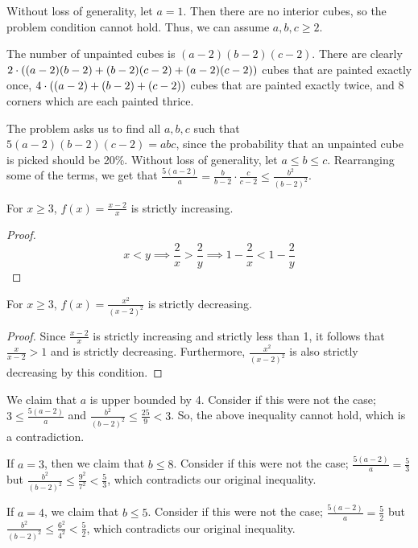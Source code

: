 \documentclass[10pt]{../usamts}
\begin{document}
\begin{solution}

Without loss of generality, let $a=1$. Then there are no interior cubes, so the problem condition cannot hold. Thus, we can assume $a,b,c \geq 2$.

The number of unpainted cubes is $(a-2)(b-2)(c-2)$. There are clearly $2 \cdot \left( (a-2)(b-2)+(b-2)(c-2)+(a-2)(c-2) \right)$ cubes that are painted exactly once, $4 \cdot \left( (a-2)+(b-2)+(c-2) \right)$ cubes that are painted exactly twice, and $8$ corners which are each painted thrice.

The problem asks us to find all $a,b,c$ such that $5(a-2)(b-2)(c-2) = abc$, since the probability that an unpainted cube is picked should be 20\%. Without loss of generality, let $a \le b \le c$. Rearranging some of the terms, we get that $\frac{5(a-2)}{a} = \frac{b}{b-2} \cdot \frac{c}{c-2} \le \frac{b^2}{(b-2)^2}$.

\begin{claim}
    For $x \ge 3$, $f(x) = \frac{x-2}{x}$ is strictly increasing.
\end{claim}
\begin{proof}
\[ x < y \implies \frac{2}{x} > \frac{2}{y} \implies 1-\frac{2}{x} < 1 - \frac{2}{y}\]
\end{proof}

\begin{claim}
    For $x \ge 3$, $f(x) = \frac{x^2}{(x-2)^2}$ is strictly decreasing.
\end{claim}
\begin{proof}
Since $\frac{x-2}{x}$ is strictly increasing and strictly less than 1, it follows that $\frac{x}{x-2} > 1$ and is strictly decreasing. Furthermore, $\frac{x^2}{(x-2)^2}$ is also strictly decreasing by this condition.
\end{proof}

We claim that $a$ is upper bounded by 4. Consider if this were not the case; $3 \le \frac{5(a-2)}{a}$ and $\frac{b^2}{(b-2)^2} \le \frac{25}{9} < 3$. So, the above inequality cannot hold, which is a contradiction.

If $a=3$, then we claim that $b \leq 8$. Consider if this were not the case; $\frac{5(a-2)}{a} = \frac{5}{3}$ but $\frac{b^2}{(b-2)^2} \leq \frac{9^2}{7^2} < \frac{5}{3}$, which contradicts our original inequality.

If $a=4$, we claim that $b \leq 5$. Consider if this were not the case; $\frac{5(a-2)}{a} = \frac{5}{2}$ but $\frac{b^2}{(b-2)^2} \leq \frac{6^2}{4^2} < \frac{5}{2}$, which contradicts our original inequality.


\end{solution}
\end{document}
